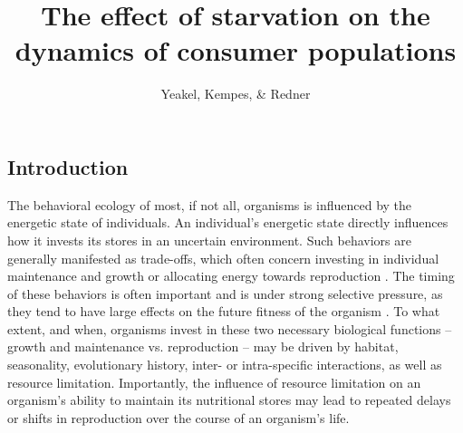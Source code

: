 \documentclass[12pt,english]{article}
\begin{document}
\begin{spacing}{1.9}


\title{The effect of starvation on the dynamics of consumer populations}
\author{Yeakel, Kempes, \& Redner}
\maketitle

\linenumbers

\section{Introduction}

The behavioral ecology of most, if not all, organisms is influenced by the energetic state of individuals.
An individual's energetic state directly influences how it invests its stores in an uncertain environment.
Such behaviors are generally manifested as trade-offs, which often concern investing in individual maintenance and growth or allocating energy towards reproduction \citep{Kirk:1997cc,Kempes:2012hy}. %
The timing of these behaviors is often important and is under strong selective pressure, as they tend to have large effects on the future fitness of the organism \citep{Mangel:1988uaa}.
To what extent, and when, organisms invest in these two necessary biological functions -- growth and maintenance vs. reproduction -- may be driven by habitat, seasonality, evolutionary history, inter- or intra-specific interactions, as well as resource limitation.
Importantly, the influence of resource limitation on an organism's ability to maintain its nutritional stores may lead to repeated delays or shifts in reproduction over the course of an organism's life. %


\end{spacing}
\end{document}
